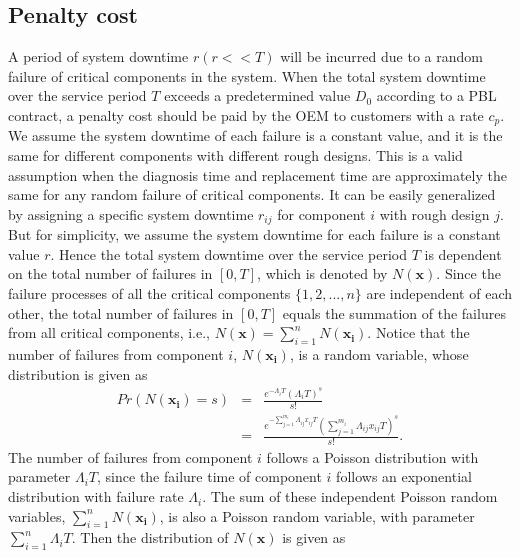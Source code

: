 \documentclass[10pt,a4paper]{article}
\begin{document}
\subsection{Penalty cost}
A period of system downtime $r(r<<T)$ will be incurred due to a random failure of critical components in the system. When the total system downtime over the service period $T$ exceeds a predetermined value $D_0$ according to a PBL contract, a penalty cost should be paid by the OEM to customers with a rate $c_p$. We assume the system downtime of each failure is a constant value, and it is the same for different components with different rough designs. This is a valid assumption when the diagnosis time and replacement time are approximately the same for any random failure of critical components. It can be easily generalized by assigning a specific system downtime $r_{ij}$ for component $i$ with rough design $j$. But for simplicity, we assume the system downtime for each failure is a constant value $r$. Hence the total system downtime over the service period $T$ is dependent on the total number of failures in $[0,T]$, which is denoted by $N(\boldsymbol{x})$. Since the failure processes of all the critical components $\{1,2,...,n\}$ are independent of each other, the total number of failures in $[0,T]$ equals the summation of the failures from all critical components, i.e., $N(\boldsymbol{x})=\sum_{i=1}^{n}N(\boldsymbol{x_i})$. Notice that the number of failures from component $i$, $N(\boldsymbol{x_i})$, is a random variable, whose distribution is given as
\begin {eqnarray}
Pr(N(\boldsymbol{x_{i}})=s) &=& \frac{e^{-\Lambda_i T}(\Lambda_{i} T)^s}{s!} \nonumber \\
&=& \frac{e^{-\sum_{j=1}^{m_{i}}{\Lambda_{ij}x_{ij}} T}(\sum_{j=1}^{m_{i}}{\Lambda_{ij}x_{ij}} T)^s}{s!}.
\end {eqnarray}
The number of failures from component $i$ follows a Poisson distribution with parameter $\Lambda_i T$, since the failure time of component $i$ follows an exponential distribution with failure rate $\Lambda_i$. The sum of these independent Poisson random variables, $\sum_{i=1}^{n}N(\boldsymbol{x_i})$, is also a Poisson random variable, with parameter $\sum_{i=1}^{n}\Lambda_i T$. Then the distribution of $N(\boldsymbol{x})$ is given as
\end{document}
